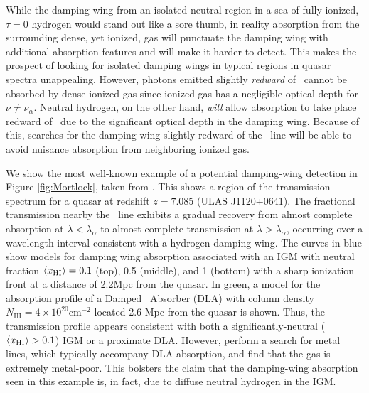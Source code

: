 While the damping wing from an isolated neutral region in a sea of fully-ionized, $\tau = 0$ hydrogen would stand out like a sore thumb, in reality absorption from the surrounding dense, yet ionized, gas will punctuate the damping wing with additional absorption features and will make it harder to detect. This makes the prospect of looking for isolated damping wings in typical regions in quasar spectra unappealing. However, photons emitted slightly \textit{redward} of \lya\ cannot be absorbed by dense ionized gas since ionized gas has a negligible optical depth for $\nu \neq \nu_{\alpha}$. Neutral hydrogen, on the other hand, \textit{will} allow absorption to take place redward of \lya\ due to the significant optical depth in the damping wing. Because of this, searches for the damping wing slightly redward of the \lya\ line will be able to avoid nuisance absorption from neighboring ionized gas.


We show the most well-known example of a potential damping-wing detection in Figure \ref{fig:Mortlock}, taken from \cite{Mortlock2011}. This shows a region of the transmission spectrum for a quasar at redshift $z = 7.085$ (ULAS J1120+0641). The fractional transmission nearby the \lya\ line exhibits a gradual recovery from almost complete absorption at $\lambda < \lambda_{\alpha}$ to almost complete transmission at $\lambda > \lambda_{\alpha}$, occurring over a wavelength interval consistent with a hydrogen damping wing. The curves in blue show models for damping wing absorption associated with an IGM with neutral fraction $\langle x_{\text{HI}}\rangle = 0.1$ (top), 0.5 (middle), and 1 (bottom) with a sharp ionization front at a distance of 2.2Mpc from the quasar. In green, a model for the absorption profile of a Damped \lya\ Absorber (DLA) with column density $N_{\text{HI}} = 4\times10^{20}\text{cm}^{-2}$ located 2.6 Mpc from the quasar is shown. Thus, the transmission profile appears consistent with both a significantly-neutral ($\langle x_{\text{HI}}\rangle > 0.1$) IGM or a proximate DLA. However, \cite{Simcoe} perform a search for metal lines, which typically accompany DLA absorption, and find that the gas is extremely metal-poor. This bolsters the claim that the damping-wing absorption seen in this example is, in fact, due to diffuse neutral hydrogen in the IGM. 


